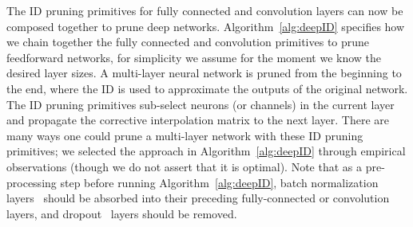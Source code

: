 The ID pruning primitives for fully connected and convolution layers can now be composed together to prune deep networks.
Algorithm~\ref{alg:deepID} specifies how we chain together the fully connected and convolution primitives to prune feedforward networks, for simplicity we assume for the moment we know the desired layer sizes.
A multi-layer neural network is pruned from the beginning to the end, where the ID is used to approximate the outputs of the original network.
The ID pruning primitives sub-select neurons (or channels) in the current layer and propagate the corrective interpolation matrix to the next layer.
There are many ways one could prune a multi-layer network with these ID pruning primitives;
we selected the approach in Algorithm~\ref{alg:deepID} through empirical observations (though we do not assert that it is optimal).
Note that as a pre-processing step before running Algorithm~\ref{alg:deepID}, batch normalization layers~\cite{batchnorm} should be absorbed into their preceding fully-connected or convolution layers, and dropout~\cite{srivastava2014dropout} layers should be removed.


